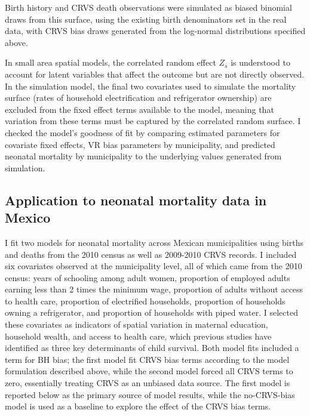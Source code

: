 \documentclass[
]{report}
\begin{document}
Birth history and CRVS death observations were simulated as biased binomial draws from this surface, using the existing birth denominators set in the real data, with CRVS bias draws generated from the log-normal distributions specified above.

In small area spatial models, the correlated random effect \(Z_s\) is understood to account for latent variables that affect the outcome but are not directly observed.\autocite{Divino2009} In the simulation model, the final two covariates used to simulate the mortality surface (rates of household electrification and refrigerator ownership) are excluded from the fixed effect terms available to the model, meaning that variation from these terms must be captured by the correlated random surface. I checked the model's goodness of fit by comparing estimated parameters for covariate fixed effects, VR bias parameters by municipality, and predicted neonatal mortality by municipality to the underlying values generated from simulation.

\hypertarget{application-to-neonatal-mortality-data-in-mexico}{%
\subsection{Application to neonatal mortality data in Mexico}\label{application-to-neonatal-mortality-data-in-mexico}}

I fit two models for neonatal mortality across Mexican municipalities using births and deaths from the 2010 census as well as 2009-2010 CRVS records.\autocite{INEGI2010,INEGI2010a} I included six covariates observed at the municipality level, all of which came from the 2010 census: years of schooling among adult women, proportion of employed adults earning less than 2 times the minimum wage, proportion of adults without access to health care, proportion of electrified households, proportion of households owning a refrigerator, and proportion of households with piped water. I selected these covariates as indicators of spatial variation in maternal education, household wealth, and access to health care, which previous studies have identified as three key determinants of child survival.\autocite{Gakidou2010,Chalasani2012,Rutherford2010} Both model fits included a term for BH bias; the first model fit CRVS bias terms according to the model formulation described above, while the second model forced all CRVS terms to zero, essentially treating CRVS as an unbiased data source. The first model is reported below as the primary source of model results, while the no-CRVS-bias model is used as a baseline to explore the effect of the CRVS bias terms.
\end{document}
